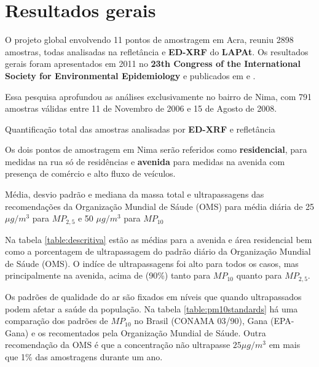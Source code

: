 \section{Resultados gerais}

O projeto global envolvendo 11 pontos de amostragem em Acra, 
reuniu 2898 amostras, todas analisadas na refletância e \textbf{ED-XRF}
do \textbf{LAPAt}. 
Os resultados gerais foram apresentados em 2011 no
\textbf{23th Congress of the International Society for Environmental 
Epidemiology} \citep{zhou2011} e publicados em \citep{zhou2013} e \citep{zhou2014}. 

Essa pesquisa aprofundou as análises exclusivamente no bairro de Nima, 
com 791 amostras válidas entre 11 de Novembro de 2006 e 15 de Agosto de 2008.

\begin{table}[H]
  \centering
  \begin{scriptsize}
  
  \end{scriptsize}
  \caption{Quantificação total das amostras analisadas por \textbf{ED-XRF} e refletância}
\end{table}

Os dois pontos de amostragem em Nima serão referidos como \textbf{residencial},
para medidas na rua só de residências e \textbf{avenida} para medidas na avenida
com presença de comércio e alto fluxo de veículos.

\begin{table}[H]
 \centering
  \begin{scriptsize}
    
  \end{scriptsize} 
  \caption{Média, desvio padrão e mediana da massa total e ultrapassagens das 
           recomendações da Organização Mundial de Sáude (OMS) para média diária de 
           25 $\mu g/m^3$ para $MP_{2,5}$ e 50 $\mu g/m^3$ para $MP_{10}$
           \label{table:descritiva}}
\end{table}

Na tabela \ref{table:descritiva} estão as médias para a avenida e área residencial
bem como a porcentagem de ultrapassagem do padrão diário da 
Organização Mundial de Sáude (OMS).
O indíce de ultrapassagens foi alto para todos os casos, mas principalmente na avenida,
acima de (90\%) tanto para $MP_{10}$ quanto para $MP_{2,5}$.

Os padrões de qualidade do ar são fixados em níveis que quando ultrapassados 
podem afetar a saúde da população. 
Na tabela \ref{table:pm10standards} há uma comparação dos padrões de $MP_{10}$ 
no Brasil (CONAMA 03/90), Gana (EPA-Gana) e os recomentados pela Organização
Mundial de Sáude.
Outra recomendação da OMS é que a concentração não ultrapasse $25 \mu g/m^3$ 
em mais que 1\% das amostragens durante um ano. 

